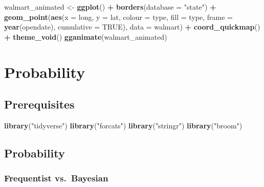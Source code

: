 \documentclass[]{book}
\newenvironment{Shaded}{\begin{snugshade}}{\end{snugshade}}
\newcommand{\DataTypeTok}[1]{\textcolor[rgb]{0.13,0.29,0.53}{#1}}
\newcommand{\KeywordTok}[1]{\textcolor[rgb]{0.13,0.29,0.53}{\textbf{#1}}}
\newcommand{\NormalTok}[1]{#1}
\newcommand{\OperatorTok}[1]{\textcolor[rgb]{0.81,0.36,0.00}{\textbf{#1}}}
\newcommand{\OtherTok}[1]{\textcolor[rgb]{0.56,0.35,0.01}{#1}}
\newcommand{\StringTok}[1]{\textcolor[rgb]{0.31,0.60,0.02}{#1}}
\theoremstyle{definition}
\theoremstyle{definition}
\theoremstyle{definition}
\theoremstyle{remark}
\begin{document}
\begin{Shaded}
\begin{Highlighting}[]
\NormalTok{walmart_animated <-}
\StringTok{  }\KeywordTok{ggplot}\NormalTok{() }\OperatorTok{+}
\StringTok{    }\KeywordTok{borders}\NormalTok{(}\DataTypeTok{database =} \StringTok{"state"}\NormalTok{) }\OperatorTok{+}
\StringTok{    }\KeywordTok{geom_point}\NormalTok{(}\KeywordTok{aes}\NormalTok{(}\DataTypeTok{x =}\NormalTok{ long, }\DataTypeTok{y =}\NormalTok{ lat,}
                   \DataTypeTok{colour =}\NormalTok{ type,}
                   \DataTypeTok{fill =}\NormalTok{ type,}
                   \DataTypeTok{frame =} \KeywordTok{year}\NormalTok{(opendate),}
                   \DataTypeTok{cumulative =} \OtherTok{TRUE}\NormalTok{),}
               \DataTypeTok{data =}\NormalTok{ walmart) }\OperatorTok{+}
\StringTok{    }\KeywordTok{coord_quickmap}\NormalTok{() }\OperatorTok{+}
\StringTok{    }\KeywordTok{theme_void}\NormalTok{()}
\KeywordTok{gganimate}\NormalTok{(walmart_animated)}
\end{Highlighting}
\end{Shaded}

\hypertarget{probability}{%
\chapter{Probability}\label{probability}}

\hypertarget{prerequisites-7}{%
\section*{Prerequisites}\label{prerequisites-7}}

\begin{Shaded}
\begin{Highlighting}[]
\KeywordTok{library}\NormalTok{(}\StringTok{"tidyverse"}\NormalTok{)}
\KeywordTok{library}\NormalTok{(}\StringTok{"forcats"}\NormalTok{)}
\KeywordTok{library}\NormalTok{(}\StringTok{"stringr"}\NormalTok{)}
\KeywordTok{library}\NormalTok{(}\StringTok{"broom"}\NormalTok{)}
\end{Highlighting}
\end{Shaded}

\hypertarget{probability-1}{%
\section{Probability}\label{probability-1}}

\hypertarget{frequentist-vs.bayesian}{%
\subsection{Frequentist vs.~Bayesian}\label{frequentist-vs.bayesian}}
\end{document}
